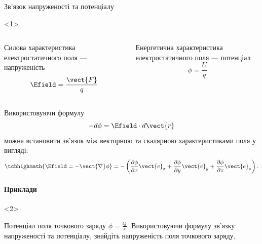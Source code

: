 \documentclass{beamer}
\begin{document}
\begin{frame}{Зв'язок напруженості та потенціалу}{}
	\begin{onlyenv}
		\begin{columns}
			\begin{column}{0.5\linewidth}
				\begin{block}{}\centering
					\alert{Силова характеристика} електростатичного поля ---
					напруженість
					\begin{equation*}
						\Efield = \frac{\vect{F}}{q}
					\end{equation*}
				\end{block}
			\end{column}
			\begin{column}{0.5\linewidth}
				\begin{block}{}\centering
					\alert{Енергетична характеристика} електростатичного поля ---
					потенціал
					\begin{equation*}
						\phi = \frac{U}{q}
					\end{equation*}
				\end{block}
			\end{column}
		\end{columns}
	\end{onlyenv}
	\begin{block}{}
		Використовуючи формулу
		\begin{equation*}
			-d\phi = \Efield\cdot d\vect{r}
		\end{equation*}
		можна встановити зв'язок між векторною та скалярною характеристиками поля у
		вигляді:
		\begin{equation*}
			\tcbhighmath{\Efield = - \vect{\nabla}\phi }= - \left( \frac{\partial
				\phi}{\partial x}
			\vect{e}_x + \frac{\partial \phi}{\partial y} \vect{e}_y + \frac{\partial
				\phi}{\partial z} \vect{e}_z\right).
		\end{equation*}
	\end{block}

	\framesubtitle<2>{Приклади}
	\begin{onlyenv}
		\begin{exampleblock}{}\justifying
			Потенціал поля точкового заряду $\phi = \frac{Q}{r}$. Використовуючи
			формулу зв'язку напруженості та потенціалу, знайдіть напруженість поля
			точкового заряду.
		\end{exampleblock}

	\end{onlyenv}
\end{frame}
\end{document}

